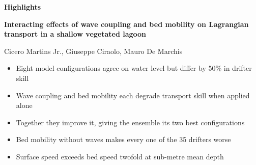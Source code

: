 \documentclass[11pt]{article}
\begin{document}
\begin{center}
{\large\bfseries Highlights}
\end{center}

\vspace{0.4cm}

\textbf{Interacting effects of wave coupling and bed mobility on Lagrangian
transport in a shallow vegetated lagoon}

Cicero Martins Jr., Giuseppe Ciraolo, Mauro De Marchis

\vspace{0.6cm}

\begin{itemize}[leftmargin=1.2em, itemsep=0.5em]
  \item Eight model configurations agree on water level but differ by 50\% in drifter skill
  \item Wave coupling and bed mobility each degrade transport skill when applied alone
  \item Together they improve it, giving the ensemble its two best configurations
  \item Bed mobility without waves makes every one of the 35 drifters worse
  \item Surface speed exceeds bed speed twofold at sub-metre mean depth
\end{itemize}
\end{document}
